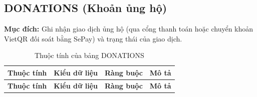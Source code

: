 \subsection{DONATIONS (Khoản ủng hộ)}

\textbf{Mục đích:} Ghi nhận giao dịch ủng hộ (qua cổng thanh toán hoặc chuyển khoản VietQR đối soát bằng SePay) và trạng thái của giao dịch.

{\small
\begin{longtable}{|P{3.2cm}|P{2.8cm}|P{2.2cm}|p{5.4cm}|}
    \caption{Thuộc tính của bảng DONATIONS}
    \label{tab:donations} \\
    \hline
    \textbf{Thuộc tính} & \textbf{Kiểu dữ liệu} & \textbf{Ràng buộc} & \textbf{Mô tả} \\
    \hline
    \endfirsthead
    \hline
    \textbf{Thuộc tính} & \textbf{Kiểu dữ liệu} & \textbf{Ràng buộc} & \textbf{Mô tả} \\
    \hline
    \endhead


\end{longtable}}
